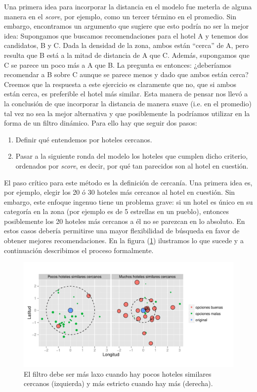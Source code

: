 \documentclass[12pt]{report}
\begin{document}
Una primera idea para incorporar la distancia en el modelo fue meterla de alguna manera en el \emph{score}, por ejemplo, como un tercer término en el promedio. Sin embargo, encontramos un argumento que sugiere que esto podría no ser la mejor idea: Supongamos que buscamos recomendaciones para el hotel A y tenemos dos candidatos, B y C. Dada la densidad de la zona, ambos están ``cerca'' de A, pero resulta que B está a la mitad de distancia de A que C. Además, supongamos que C se parece un poco más a A que B. La pregunta es entonces: ¿deberíamos recomendar a B sobre C aunque se parece menos y dado que ambos están cerca? Creemos que la respuesta a este ejercicio es claramente que no, que si ambos están cerca, es preferible el hotel más similar. Esta manera de pensar nos llevó a la conclusión de que incorporar la distancia de manera suave (i.e. en el promedio) tal vez no sea la mejor alternativa y que posiblemente la podríamos utilizar en la forma de un filtro dinámico. Para ello hay que seguir dos pasos:
\begin{enumerate}
	\item Definir qué entendemos por hoteles cercanos.
	\item Pasar a la siguiente ronda del modelo los hoteles que cumplen dicho criterio, ordenados por \emph{score}, es decir, por qué tan parecidos son al hotel en cuestión.
\end{enumerate}
El paso crítico para este método es la definición de cercanía. Una primera idea es, por ejemplo, elegir los 20 ó 30 hoteles más cercanos al hotel en cuestión. Sin embargo, este enfoque ingenuo tiene un problema grave: si un hotel es único en su categoría en la zona (por ejemplo es de 5 estrellas en un pueblo), entonces posiblemente los 20 hoteles más cercanos a él no se parezcan en lo absoluto. En estos casos debería permitirse una mayor flexibilidad de búsqueda en favor de obtener mejores recomendaciones. En la figura (\ref{fig:distdin}) ilustramos lo que sucede y a continuación describimos el proceso formalmente.
\begin{figure}[ht]
	\centering
	\includegraphics[width=\textwidth]{imagenes/distdin.pdf}
	\caption{\label{fig:distdin} El filtro debe ser más laxo cuando hay pocos hoteles similares cercanos (izquierda) y más estricto cuando hay más (derecha).}
\end{figure}
\end{document}
